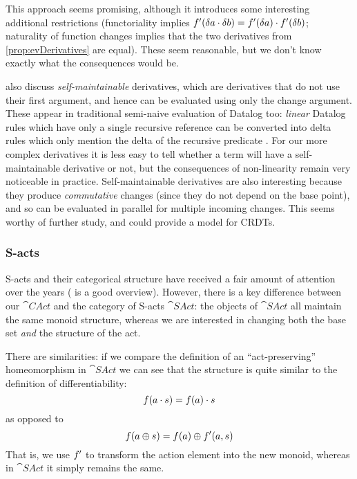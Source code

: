 This approach seems promising, although it introduces some
interesting additional restrictions (functoriality implies $f'(\delta a \cdot \delta b) =
f'(\delta a) \cdot f'(\delta b)$; naturality of function
changes implies that the two derivatives from \cref{prop:evDerivatives} are equal). These seem
reasonable, but we don't know exactly what the consequences would be.

\citeauthor{cai2014changes} also discuss \emph{self-maintainable} derivatives,
which are derivatives that do not use their first argument, and hence can be
evaluated using only the change argument. These appear in traditional semi-naive
evaluation of Datalog too: \emph{linear} Datalog rules which have only a single
recursive reference can be converted into delta rules which only mention the
delta of the recursive predicate \autocite[See][section
13.1]{abiteboul1995foundations}. For our more complex derivatives it is less
easy to tell whether a term will have a self-maintainable derivative or not, but
the consequences of non-linearity remain very noticeable in practice.
Self-maintainable derivatives are also interesting because they produce 
\emph{commutative} changes (since they do not depend on the base point), and so can be
evaluated in parallel for multiple incoming changes. This seems worthy of
further study, and could provide a model for CRDTs.

\subsubsection{S-acts}

S-acts and their categorical structure have received a fair amount of attention
over the years (\textcite{kilp2000monoids} is a good
overview). However, there is a key difference between our $\cat{CAct}$ and the category of
S-acts $\cat{SAct}$: the objects of $\cat{SAct}$ all maintain the same monoid
structure, whereas we are interested in changing both the base set \emph{and} the structure of the act.

There are similarities: if we compare the definition of an ``act-preserving''
homeomorphism in $\cat{SAct} $\autocite[See][]{kilp2000monoids} we can see that the structure is
quite similar to the definition of differentiability:
\begin{displaymath}
  f(a \cdot s) = f(a) \cdot s
\end{displaymath}
as opposed to
\begin{displaymath}
  f(a \oplus s) = f(a) \oplus f'(a, s)
\end{displaymath}
That is, we use $f'$ to transform the action element into the new
monoid, whereas in $\cat{SAct}$ it simply remains the same.

